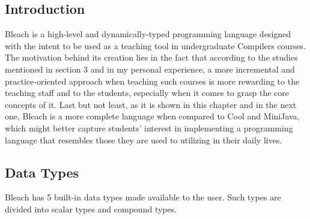 \subsection{Introduction}
Bleach is a high-level and dynamically-typed programming language designed with the intent to be used as a teaching tool in undergraduate Compilers courses. The motivation behind its creation lies in the fact that according to the studies mentioned in section 3 and in my personal experience, a more incremental and practice-oriented approach when teaching such courses is more rewarding to the teaching staff and to the students, especially when it comes to grasp the core concepts of it. Last but not least, as it is shown in this chapter and in the next one, Bleach is a more complete language when compared to Cool and MiniJava, which might better capture students' interest in implementing a programming language that resembles those they are used to utilizing in their daily lives.

\subsection{Data Types}
Bleach has 5 built-in data types made available to the user. Such types are divided into scalar types  and compound types.

